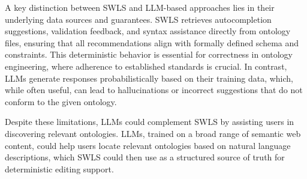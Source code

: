 A key distinction between SWLS and LLM-based approaches lies in their underlying data sources and guarantees.
SWLS retrieves autocompletion suggestions, validation feedback, and syntax assistance directly from ontology files, ensuring that all recommendations align with formally defined schema and constraints.
This deterministic behavior is essential for correctness in ontology engineering, where adherence to established standards is crucial. 
In contrast, LLMs generate responses probabilistically based on their training data, which, while often useful, can lead to hallucinations or incorrect suggestions that do not conform to the given ontology.

Despite these limitations, LLMs could complement SWLS by assisting users in discovering relevant ontologies.
LLMs, trained on a broad range of semantic web content, could help users locate relevant ontologies based on natural language descriptions, which SWLS could then use as a structured source of truth for deterministic editing support.  

